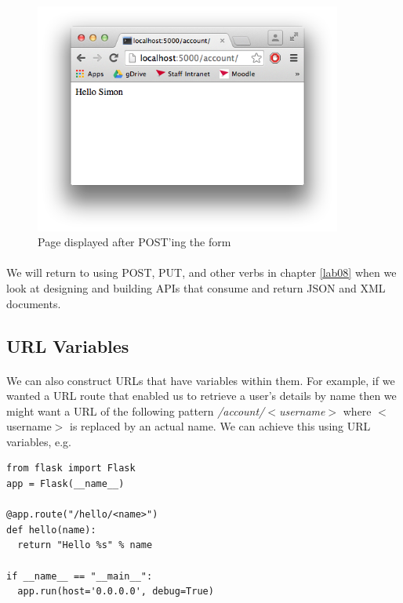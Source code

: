 \documentclass[12pt, a4paper, twoside]{book}
\begin{document}
\begin{figure}[H]
\centering
\includegraphics[width=0.9\textwidth]{images/flask-form-data.png}
\caption{Page displayed after POST'ing the form}
\label{fig:flask-form-data}
\end{figure}



\paragraph{} We will return to using POST, PUT, and other verbs in chapter \ref{lab08} when we look at designing and building APIs that consume and return JSON and XML documents.


\subsection{URL Variables}
\label{url-variables}
\paragraph{} We can also construct URLs that have variables within them. For example, if we wanted a URL route that enabled us to retrieve a user's details by name then we might want a URL of the following pattern \emph{/account/$<$username$>$} where $<$username$>$ is replaced by an actual name. We can achieve this using URL variables, e.g.

\begin{lstlisting}
from flask import Flask
app = Flask(__name__)

@app.route("/hello/<name>")
def hello(name):
  return "Hello %s" % name

if __name__ == "__main__":
  app.run(host='0.0.0.0', debug=True)
\end{lstlisting}
\end{document}
